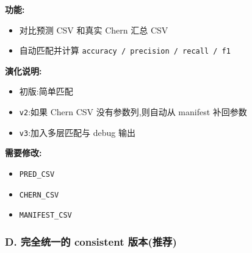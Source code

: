 \documentclass[lang=cn,scheme=chinese,color=blue,device=normal,toc=onecol,math=cm]{elegantbook}
\begin{document}
\begin{enumerate}
\textbf{功能:}\par
 
\begin{itemize}
\item 对比预测 CSV 和真实 Chern 汇总 CSV
\item 自动匹配并计算 \texttt{accuracy /\allowbreak{} precision /\allowbreak{} recall /\allowbreak{} f1}
\end{itemize}
 
\textbf{演化说明:}\par
 
\begin{itemize}
\item 初版:简单匹配
\item \texttt{v2}:如果 Chern CSV 没有参数列,则自动从 manifest 补回参数
\item \texttt{v3}:加入多层匹配与 debug 输出
\end{itemize}
 
\textbf{需要修改:}\par
 
\begin{itemize}
\item \texttt{PRED\_\allowbreak{}CSV}
\item \texttt{CHERN\_\allowbreak{}CSV}
\item \texttt{MANIFEST\_\allowbreak{}CSV}
\end{itemize}
\end{enumerate}


\subsubsection{D. 完全统一的 consistent 版本(推荐)}
\end{document}
